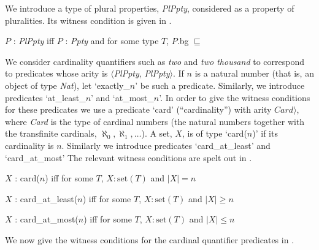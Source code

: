 We introduce a type of plural properties, \textit{PlPpty}, considered
as a property of pluralities. Its
witness condition is given in \nexteg{}.
\begin{ex} 
$P$ : \textit{PlPpty} iff $P$ : \textit{Ppty} and for some type $T$,
$P$.bg $\sqsubseteq$  
\end{ex} 
  

We consider cardinality quantifiers such as \textit{two} and
\textit{two thousand} to correspond to predicates whose arity is
$\langle$\textit{PlPpty}, \textit{PlPpty}$\rangle$.  If $n$ is a
natural number (that is, an object of type \textit{Nat}), let `exactly\_$n$' be such a predicate.  Similarly,
we introduce predicates `at\_least\_$n$' and
`at\_most\_$n$'.  In order to give the witness conditions
for these predicates we use a predicate `card'
(``cardinality'') with arity $\textit{Card}\rangle$, where \textit{Card} is the type of cardinal numbers
(the natural numbers together with the transfinite cardinals,
$\aleph_0, \aleph_1, \ldots$).  A set, $X$, is of type `card($n$)' if
its cardinality is $n$. Similarly we introduce predicates
`card\_at\_least' and `card\_at\_most'
The relevant witness conditions are spelt out in \nexteg{}.
\begin{ex}
  \begin{subex} 
 
\item $X$ : card($n$) iff for some $T$, $X:\mathrm{set}(T)$ and $|X|=n$ 
 
\item $X$ : card\_at\_least($n$) iff for some $T$, $X:\mathrm{set}(T)$
  and $|X|\geq n$

  
\item $X$ : card\_at\_most($n$) iff for some $T$, $X:\mathrm{set}(T)$
  and $|X|\leq n$
 
\end{subex} 
  
\end{ex} 
We now give the witness conditions for the cardinal quantifier
predicates in \nexteg{}.
